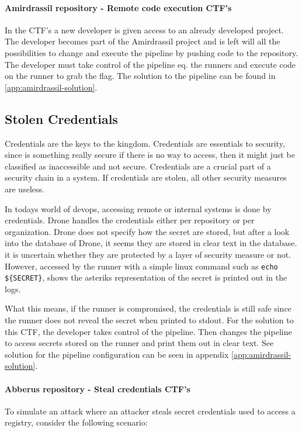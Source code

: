 \paragraph{Amirdrassil repository\cite{photoview} - Remote code execution CTF's}
In the CTF's a new developer is given access to an already developed project. 
The developer becomes part of the Amirdrassil project 
and is left will all the possibilities to change and execute the pipeline by pushing code to the repository. The developer 
must take control of the pipeline eq. the runners and execute code on the runner to grab the flag. 
The solution to the pipeline can be found in \ref{app:amirdrassil-solution}.

\subsection{Stolen Credentials}
\label{sec:stolen_credentials}
Credentials are the keys to the kingdom. Credentials are essentials to security, since is something really secure if there is no 
way to access, then it might just be classified as inaccessible and not secure. Credentials are a crucial part of a security chain in a 
system. If credentials are stolen, all other security measures are useless.

In todays world of \ac{devops}, accessing remote or internal systems is done by credentials.
Drone handles the credentials either per repository or per organization. Drone does not specify how the secret are stored,
but after a look into the database of Drone, it seems they are stored in clear text in the database. 
it is uncertain whether they are protected by a layer of security measure or not.
However, accessed by the runner with a simple linux command such as \texttt{echo \$\{SECRET\}}, shows the asteriks representation of 
the secret is printed out in the logs.

What this means, if the runner is compromised, the credentials is still safe since the runner does not reveal the secret when printed to stdout.
For the solution to this CTF, the developer takes control of the pipeline. Then changes the pipeline to access secrets stored on the runner and 
print them out in clear text. See solution for the pipeline configuration can be seen in appendix \ref{app:amirdrassil-solution}.

\paragraph{Abberus repository\cite{flask-foundation} - Steal credentials CTF's}
To simulate an attack where an attacker steals secret credentials used to access a registry, consider the following scenario:

